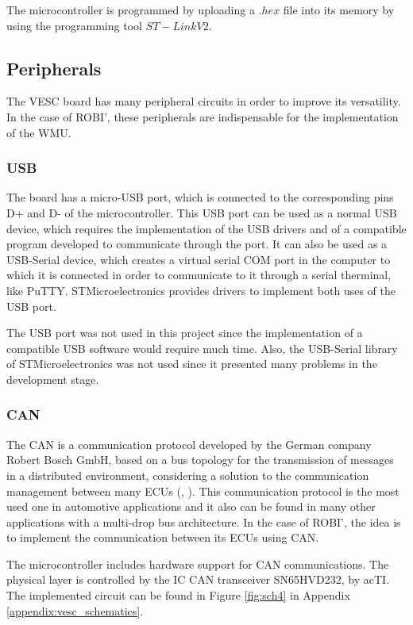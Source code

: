 The microcontroller is programmed by uploading a $.hex$ file into its memory by using the programming tool $ST-Link V2$.

\subsection{Peripherals}

The VESC board has many peripheral circuits in order to improve its versatility. In the case of ROBI', these peripherals are indispensable for the implementation of the \ac{WMU}.

\subsubsection{USB}

The board has a micro-\ac{USB} port, which is connected to the corresponding pins D+ and D- of the microcontroller. This \acf{USB} port can be used as a normal \ac{USB} device, which requires the implementation of the \ac{USB} drivers and of a compatible program developed to communicate through the port. It can also be used as a \ac{USB}-Serial device, which creates a virtual serial COM port in the computer to which it is connected in order to communicate to it through a serial therminal, like PuTTY. STMicroelectronics provides drivers to implement both uses of the \ac{USB} port.

The \ac{USB} port was not used in this project since the implementation of a compatible \ac{USB} software would require much time. Also, the \ac{USB}-Serial library of STMicroelectronics was not used since it presented many problems in the development stage.

\subsubsection{CAN}

The \acf{CAN} is a communication protocol developed by the German company Robert Bosch GmbH, based on a bus topology for the transmission of messages in a distributed environment, considering a solution to the communication management between many \ac{ECU}s (\citeauthor{CAN}, \citeyear{CAN}). This communication protocol is the most used one in automotive applications and it also can be found in many other applications with a multi-drop bus architecture. In the case of ROBI', the idea is to implement the communication between its \ac{ECU}s using \ac{CAN}.

The microcontroller includes hardware support for \ac{CAN} communications. The physical layer is controlled by the \ac{IC} \ac{CAN} transceiver SN65HVD232, by ac{TI}. The implemented circuit can be found in Figure \ref{fig:sch4} in Appendix \ref{appendix:vesc_schematics}.

